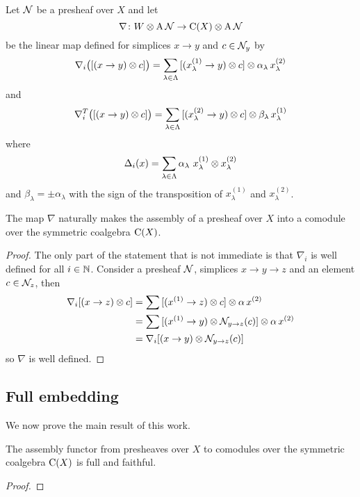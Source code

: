 Let $\mathcal{N}$ be a presheaf over $X$ and let
\[
\nabla \colon W \otimes \operatorname{A} \mathcal{N} \to \operatorname{C}(X) \otimes \operatorname{A} \mathcal{N}
\]
be the linear map defined for simplices $x \to y$ and $c \in \mathcal{N}_y$ by
\[
\nabla_i \big( [(x \to y) \otimes c] \big) =
\sum_{\lambda \in \Lambda} {[(x_\lambda^{(1)} \to y) \otimes c]} \otimes \alpha_\lambda \, x_\lambda^{(2)}
\]
and
\[
\nabla_i^T \big( [(x \to y) \otimes c] \big) =
\sum_{\lambda \in \Lambda} {[(x_\lambda^{(2)} \to y) \otimes c]} \otimes \beta_\lambda \, x_\lambda^{(1)}
\]
where
\[
\Delta_i(x) = \sum_{\lambda \in \Lambda} \alpha_\lambda \ x_\lambda^{(1)} \otimes x_\lambda^{(2)}
\]
and
$\beta_\lambda = \pm \alpha_\lambda$ with the sign of the transposition of $x_\lambda^{(1)}$ and $x_\lambda^{(2)}$.

\begin{lemma*}
	The map $\nabla$ naturally makes the assembly of a presheaf over $X$ into a comodule over the symmetric coalgebra $\operatorname{C}(X)$.
\end{lemma*}

\begin{proof}
	The only part of the statement that is not immediate is that $\nabla_i$ is well defined for all $i \in \mathbb{N}$.
	Consider a presheaf $\mathcal{N}$, simplices $x \to y \to z$ and an element $c \in \mathcal{N}_z$, then
	\begin{align*}
		\nabla_i [(x \to z) \otimes c] &=
		\sum {[(x^{(1)} \to z) \otimes c]} \otimes \alpha \, x^{(2)} \\ &=
		\sum {[(x^{(1)} \to y) \otimes\mathcal{N}_{y \to z}(c)]} \otimes \alpha \, x^{(2)} \\ &=
		\nabla_i [(x \to y) \otimes \mathcal{N}_{y \to z}(c)]
	\end{align*}
	so $\nabla$ is well defined.
\end{proof}

\subsection{Full embedding} \label{ss:full embedding}

We now prove the main result of this work.

\begin{theorem*}
	The assembly functor from presheaves over $X$ to comodules over the symmetric coalgebra $\operatorname{C}(X)$ is full and faithful.
\end{theorem*}

\begin{proof}
	
\end{proof}
